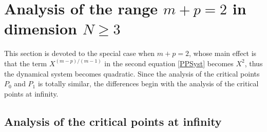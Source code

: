 \documentclass[a4paper,11pt]{article}
\numberwithin{equation}{section}
\begin{document}
\section{Analysis of the range $m+p=2$ in dimension $N\geq3$}\label{sec.equal}

This section is devoted to the special case when $m+p=2$, whose main effect is that the term $X^{(m-p)/(m-1)}$ in the second equation \eqref{PPSyst} becomes $X^2$, thus the dynamical system becomes quadratic. Since the analysis of the critical points $P_0$ and $P_1$ is totally similar, the differences begin with the analysis of the critical points at infinity.

\subsection{Analysis of the critical points at infinity}\label{subsec.infequal}
\end{document}
